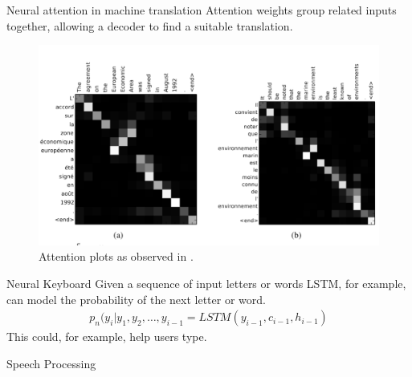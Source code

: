 \documentclass{beamer}
\begin{document}
    \begin{frame}{Neural attention in machine translation}
      Attention weights group related inputs together,
      allowing a decoder to find a suitable translation.
      \begin{figure}
      \includegraphics[scale=0.2]{./figures/attention.png}
      \caption{Attention plots as observed in \cite{Bahdanau2015NeuralMT}.}
      \end{figure}
    \end{frame}

    \begin{frame}{Neural Keyboard}
      Given a sequence of input letters or words LSTM, for example, can model
      the probability of the next letter or word.
      \begin{align}
        p_n(y_i| y_1, y_2, \dots , y_{i-1} = LSTM(y_{i-1}, c_{i-1}, h_{i-1})
      \end{align}
      This could, for example, help users type.
    \end{frame}

    \begin{frame}{Speech Processing \cite{chan2015listen}}
      \begin{figure}
        
      \end{figure}
    \end{frame}
\end{document}
